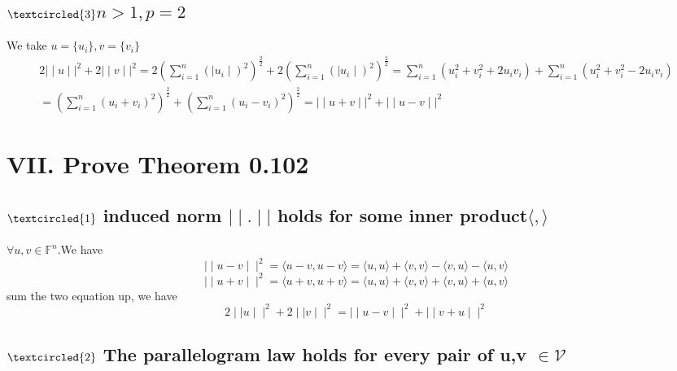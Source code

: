 \documentclass[twoside,a4paper]{article}
\begin{document}
\subsection*{\small{$\textcircled{3}$$n>1,p=2$}}
We take $u=\{u_{i}\},v=\{v_{i}\}$
\begin{equation*}
	\begin{split}
2{\mid\mid u\mid\mid}^{2}+2{\mid\mid v\mid\mid}^2=
2{(\sum_{i=1}^{n}{(\mid u_{i}\mid)}^{2})}^{\frac{2}{2}}
+2{(\sum_{i=1}^{n}{(\mid u_{i}\mid)}^{2})}^{\frac{2}{2}}=
\sum_{i=1}^{n}(u_{i}^{2}+v_{i}^{2}+2u_{i}v_{i})
+\sum_{i=1}^{n}(u_{i}^{2}+v_{i}^{2}-2u_{i}v_{i})\\=
(\sum_{i=1}^{n}(u_{i}+v_{i})^{2})^{\frac{2}{2}}
+(\sum_{i=1}^{n}(u_{i}-v_{i})^{2})^{\frac{2}{2}}=
{\mid\mid u+v\mid\mid}^{2}+{\mid\mid u-v\mid\mid}^{2}
\end{split}
\end{equation*}
\section*{VII. \small{Prove Theorem 0.102}}
\subsection*{\small{$\textcircled{1}$ induced norm $\mid\mid.\mid\mid$ holds for some inner product$\langle,\rangle$}}
	
$\forall u,v\in \mathbb{F}^n$.We have
$$\mid\mid u-v\mid\mid^{2}=\langle u-v,u-v\rangle=
\langle u,u\rangle+\langle v,v\rangle
-\langle v,u\rangle-\langle u,v\rangle$$
$$\mid\mid u+v\mid\mid^{2}=\langle u+v,u+v\rangle=
\langle u,u\rangle+\langle v,v\rangle
+\langle v,u\rangle+\langle u,v\rangle$$
sum the two equation up, we have
$$2\mid\mid u\mid\mid^{2}+2\mid\mid v\mid\mid^{2}=
\mid\mid u-v\mid\mid^2+\mid\mid v+u\mid\mid^2$$

\subsection*{\small{$\textcircled{2}$ The parallelogram law holds for every pair of u,v $\in \mathcal{V}$}}
\end{document}
